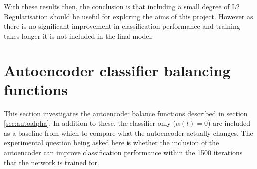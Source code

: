         With these results then, the conclusion is that including a small degree of L2
        Regularisation should be useful for exploring the aims of this project.
        However as there is no significant improvement in classification performance
        and training takes longer it is not included in the final model.


      \section{Autoencoder classifier balancing functions}
        This section investigates the autoencoder balance functions described in section \ref{sec:autoalpha}.
        In addition to these, the classifier only ($\alpha(t) = 0$) are included as a baseline from which to compare
        what the autoencoder actually changes. The experimental question being asked here
        is whether the inclusion of the autoencoder can improve classification performance within the 1500 iterations
        that the network is trained for.



